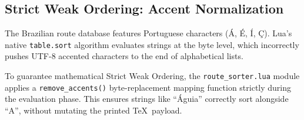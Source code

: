 \subsection{Strict Weak Ordering: Accent Normalization}
The Brazilian route database features Portuguese characters (\'A, \'E, \'I, \c{C}). Lua's native \texttt{table.sort} algorithm evaluates strings at the byte level, which incorrectly pushes UTF-8 accented characters to the end of alphabetical lists. 

To guarantee mathematical Strict Weak Ordering, the \texttt{route\_sorter.lua} module applies a \texttt{remove\_accents()} byte-replacement mapping function strictly during the evaluation phase. This ensures strings like ``\'Aguia'' correctly sort alongside ``A'', without mutating the printed \TeX\ payload.
